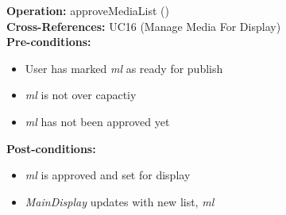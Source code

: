 \textbf{Operation:} approveMediaList () \\
\textbf{Cross-References:} UC16 (Manage Media For Display) \\
\textbf{Pre-conditions:}
\begin{itemize}
    \item User has marked \emph{ml} as ready for publish
    \item \emph{ml} is not over capactiy
    \item \emph{ml}  has not been approved yet
\end{itemize}
\textbf{Post-conditions:}
\begin{itemize}
    \item \emph{ml} is approved and set for display
    \item \emph{MainDisplay} updates with new list, \emph{ml}
\end{itemize}

